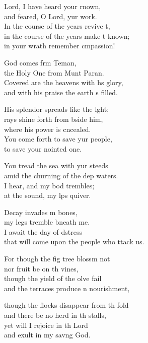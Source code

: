 \settowidth{\versewidth}{that will come upon the people who attack us.}
\begin{psalmverse}%
  \begin{patverse}
 Lord, I have heard your rnown,\Med\\
and feared, O Lord, yur work.\\
In the course of the years revive \pointup{\i}t,\Flex\\
in the course of the years make \pointup{\i}t known;\Med\\
in your wrath remember cmpassion!

God comes frm Teman,\Med\\
the Holy One from Munt Paran.\\
Covered are the heavens with h\pointup{\i}s glory,\Med\\
and with his praise the earth \pointup{\i}s filled.

His splendor spreads like the l\pointup{\i}ght;\Flex\\
rays shine forth from bside him,\Med\\
where his power is cncealed.\\
You come forth to save yur people,\Med\\
to save your nointed one.

You tread the sea with yur steeds\Med\\
amid the churning of the dep waters.\\
I hear, and my bod trembles;\Med\\
at the sound, my l\pointup{\i}ps quiver.

Decay invades m bones,\Med\\
my legs tremble bneath me.\\
I await the day of d\pointup{\i}stress\Med\\
that will come upon the people who ttack us.

For though the fig tree blossm not\Med\\
nor fruit be on th vines,\\
though the yield of the ol\pointup{\i}ve fail\Med\\
and the terraces produce n nourishment,

though the flocks disappear from th fold\Med\\
and there be no herd in th stalls,\\
yet will I rejoice in th Lord\Med\\
and exult in my sav\pointup{\i}ng God.


\end{patverse}
\end{psalmverse}
